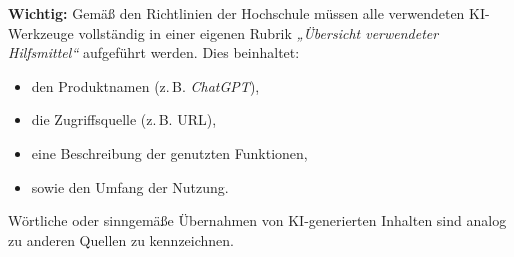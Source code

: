 \bigskip
\noindent
\textbf{Wichtig:} Gemäß den Richtlinien der Hochschule müssen alle verwendeten KI-Werkzeuge vollständig in einer eigenen Rubrik \textit{„Übersicht verwendeter Hilfsmittel“} aufgeführt werden. Dies beinhaltet:
\begin{itemize}
  \item den Produktnamen (z.\,B. \textit{ChatGPT}),
  \item die Zugriffsquelle (z.\,B. URL),
  \item eine Beschreibung der genutzten Funktionen,
  \item sowie den Umfang der Nutzung.
\end{itemize}

Wörtliche oder sinngemäße Übernahmen von KI-generierten Inhalten sind analog zu anderen Quellen zu kennzeichnen.
